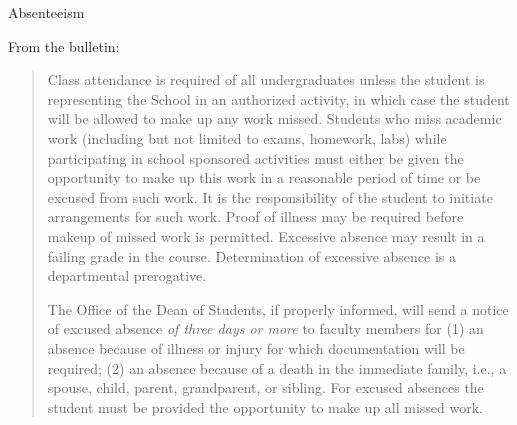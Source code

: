 \begin{frame}{Absenteeism}

From the bulletin:
\begin{quotation}
Class attendance is required of all undergraduates unless the student is representing the School in an authorized activity, in which case the student will be allowed to make up any work missed. Students who miss academic work (including but not limited to exams, homework, labs) while participating in school sponsored activities must either be given the opportunity to make up this work in a reasonable period of time or be excused from such work. It is the responsibility of the student to initiate arrangements for such work. Proof of illness may be required before makeup of missed work is permitted. Excessive absence may result in a failing grade in the course. Determination of excessive absence is a departmental prerogative.

The Office of the Dean of Students, if properly informed, will send a notice of excused absence {\em of three days or more} to faculty members for (1) an absence because of illness or injury for which documentation will be required; (2) an absence because of a death in the immediate family, i.e., a spouse, child, parent, grandparent, or sibling. For excused absences the student must be provided the opportunity to make up all missed work.

\end{quotation}

\end{frame}

